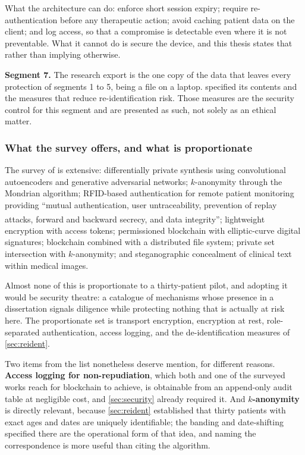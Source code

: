 \documentclass[12pt,a4paper,oneside]{report}
\newcommand{\bq}[1]{``#1''\textsuperscript{\dag}}
\begin{document}
What the architecture can do: enforce short session expiry; require re-authentication before any therapeutic action; avoid caching patient data on the client; and log access, so that a compromise is detectable even where it is not preventable. What it cannot do is secure the device, and this thesis states that rather than implying otherwise.

\textbf{Segment 7.} The research export is the one copy of the data that leaves every protection of segments 1 to 5, being a file on a laptop.  specified its contents and the measures that reduce re-identification risk. Those measures are the security control for this segment and are presented as such, not solely as an ethical matter.

\subsubsection{What the survey offers, and what is proportionate}

The survey of \textcite{liu2025review} is extensive: differentially private synthesis using convolutional autoencoders and generative adversarial networks; $k$-anonymity through the Mondrian algorithm; RFID-based authentication for remote patient monitoring providing \bq{mutual authentication, user untraceability, prevention of replay attacks, forward and backward secrecy, and data integrity}; lightweight encryption with access tokens; permissioned blockchain with elliptic-curve digital signatures; blockchain combined with a distributed file system; private set intersection with $k$-anonymity; and steganographic concealment of clinical text within medical images.

Almost none of this is proportionate to a thirty-patient pilot, and adopting it would be security theatre: a catalogue of mechanisms whose presence in a dissertation signals diligence while protecting nothing that is actually at risk here. The proportionate set is transport encryption, encryption at rest, role-separated authentication, access logging, and the de-identification measures of \cref{sec:reident}.

Two items from the list nonetheless deserve mention, for different reasons. \textbf{Access logging for non-repudiation}, which both \textcite{mucchi2021} and one of the surveyed works reach for blockchain to achieve, is obtainable from an append-only audit table at negligible cost, and \cref{sec:security} already required it. And \textbf{$k$-anonymity} is directly relevant, because \cref{sec:reident} established that thirty patients with exact ages and dates are uniquely identifiable; the banding and date-shifting specified there are the operational form of that idea, and naming the correspondence is more useful than citing the algorithm.
\end{document}
